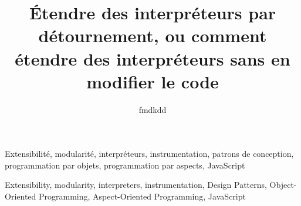

\newcommand{\titlefr}{Étendre des interpréteurs par détournement, ou comment étendre des interpréteurs sans en modifier le code}
\newcommand{\subtitlefr}{Avec une application à des analyses dynamiques pour un interpréteur de JavaScript}
\newcommand{\titleen}{Extending interpreters by diverting, or how to extend interpreters without modifying their source code}

\title{\titlefr}
\author{fmdkdd}





\begin{resume}

\end{resume}

\begin{motscles}
Extensibilité, modularité, interpréteurs, instrumentation, patrons de
conception, programmation par objets, programmation par aspects, JavaScript
\end{motscles}

\begin{abstract_}

\end{abstract_}

\begin{keywords}
Extensibility, modularity, interpreters, instrumentation, Design Patterns,
Object-Oriented Programming, Aspect-Oriented Programming, JavaScript
\end{keywords}





\frontmatter
\pagestyle{front}


